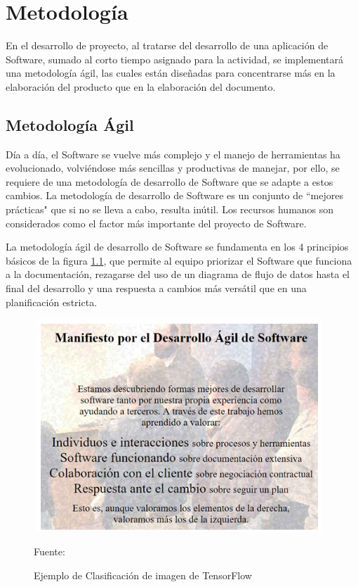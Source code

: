 \chapter{Metodología}

En el desarrollo de proyecto, al tratarse del desarrollo de una aplicación de Software, sumado al corto tiempo asignado para la actividad, se implementará una metodología ágil, las cuales están diseñadas para concentrarse más en la elaboración del producto que en la elaboración del documento.

\section{Metodología Ágil}

Día a día, el Software se vuelve más complejo y el manejo de herramientas ha evolucionado, volviéndose más sencillas y productivas de manejar, por ello, se requiere de una metodología de desarrollo de Software que se adapte a estos cambios.
La metodología de desarrollo de Software es un conjunto de ``mejores prácticas" que si no se lleva a cabo, resulta inútil\cite{carrizo2018metodo}. Los recursos humanos son considerados como el factor más importante del proyecto de Software.

La metodología ágil de desarrollo de Software se fundamenta en los 4 principios básicos de la figura \ref{manifiesto}, que permite al equipo priorizar el Software que funciona a la documentación, rezagarse del uso de un diagrama de flujo de datos hasta el final del desarrollo y una respuesta a cambios más versátil que en una planificación estricta.
\\
\begin{figure}[t!]
	\centering
	\includegraphics[width=11cm,height=8cm,]{./Images/manifiesto.png}
	\caption{Ejemplo de Clasificación de imagen de TensorFlow}
	\footnotesize Fuente: \cite{beck2001manifiesto}
	\label{manifiesto}
\end{figure}

